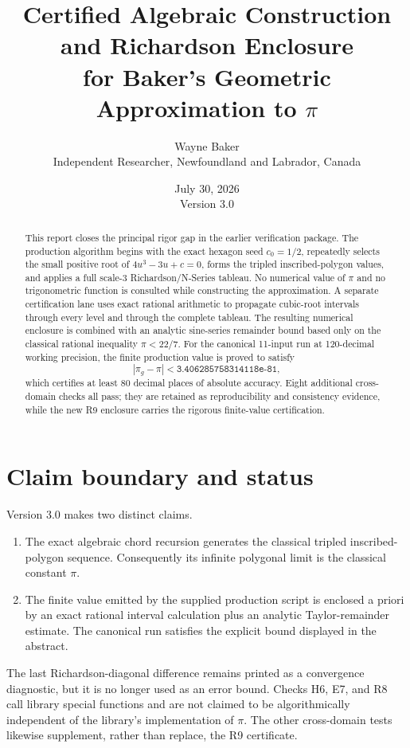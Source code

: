 \documentclass[11pt]{article}
\title{Certified Algebraic Construction and Richardson Enclosure\\for Baker's Geometric Approximation to $\pi$}
\author{Wayne Baker\\Independent Researcher, Newfoundland and Labrador, Canada}
\date{July 30, 2026\\Version 3.0}
\newcommand{\pig}{\pi_g}
\begin{document}
\maketitle

\begin{abstract}
This report closes the principal rigor gap in the earlier verification package.  The production algorithm begins with the exact hexagon seed $c_0=1/2$, repeatedly selects the small positive root of $4u^3-3u+c=0$, forms the tripled inscribed-polygon values, and applies a full scale-$3$ Richardson/N-Series tableau.  No numerical value of $\pi$ and no trigonometric function is consulted while constructing the approximation.  A separate certification lane uses exact rational arithmetic to propagate cubic-root intervals through every level and through the complete tableau.  The resulting numerical enclosure is combined with an analytic sine-series remainder bound based only on the classical rational inequality $\pi<22/7$.  For the canonical 11-input run at 120-decimal working precision, the finite production value is proved to satisfy
\[
 |\pig-\pi| < \texttt{3.406285758314118e-81},
\]
which certifies at least 80 decimal places of absolute accuracy.  Eight additional cross-domain checks all pass; they are retained as reproducibility and consistency evidence, while the new R9 enclosure carries the rigorous finite-value certification.
\end{abstract}

\tableofcontents
\newpage

\section{Claim boundary and status}

Version 3.0 makes two distinct claims.

\begin{enumerate}[label=\arabic*.]
\item The exact algebraic chord recursion generates the classical tripled inscribed-polygon sequence.  Consequently its infinite polygonal limit is the classical constant $\pi$.
\item The finite value emitted by the supplied production script is enclosed a priori by an exact rational interval calculation plus an analytic Taylor-remainder estimate.  The canonical run satisfies the explicit bound displayed in the abstract.
\end{enumerate}

The last Richardson-diagonal difference remains printed as a convergence diagnostic, but it is no longer used as an error bound.  Checks H6, E7, and R8 call library special functions and are not claimed to be algorithmically independent of the library's implementation of $\pi$.  The other cross-domain tests likewise supplement, rather than replace, the R9 certificate.
\end{document}
